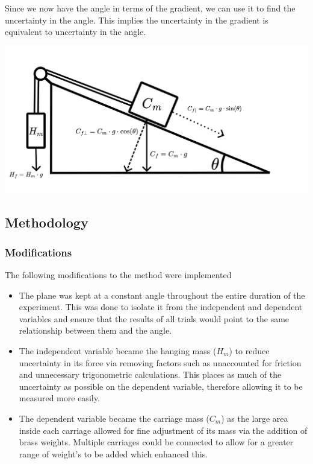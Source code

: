 \documentclass[11pt,a4paper]{article}
\begin{document}
Since we now have the angle in terms of the gradient, we can use it to find the uncertainty in the angle. 
This implies the uncertainty in the gradient is equivalent to uncertainty in the angle. 

\includegraphics[width=0.8\paperwidth]{./Diagrams/set_upV2.png}


\subsection{Methodology}

\subsubsection{Modifications}


The following modifications to the method were implemented
\begin{itemize}
	\item The plane was kept at a constant angle throughout the entire duration of the experiment. This was done to isolate it from the independent and dependent variables and ensure that the results of all trials would point to the same relationship between them and the angle.
	\item The independent variable became the hanging mass ($H_m$) to reduce uncertainty in its force via removing factors such as unaccounted for friction and unnecessary trigonometric calculations. This places as much of the uncertainty as possible on the dependent variable, therefore allowing it to be measured more easily.
	\item The dependent variable became the carriage mass ($C_m$) as the large area inside each carriage allowed for fine adjustment of its mass via the addition of brass weights. Multiple carriages could be connected to allow for a greater range of weight's to be added which enhanced this.
\end{itemize}
\end{document}
